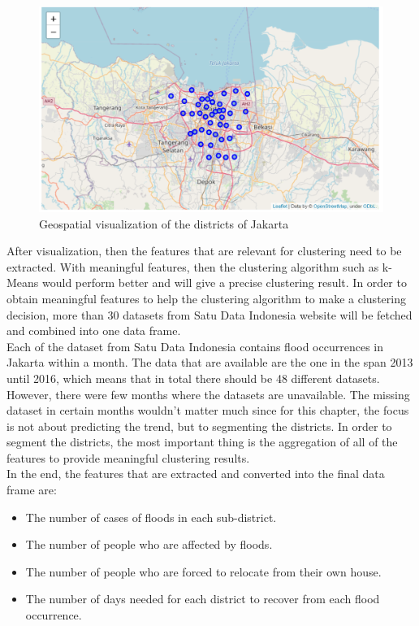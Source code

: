 \begin{figure}
\begin{center}
\graphicspath{ {./Pict/} }
\includegraphics[scale=0.8]{map.png}
\caption{Geospatial visualization of the districts of Jakarta}\label{fig=map.png}
\end{center}
\end{figure}


\noindent
After visualization, then the features that are relevant for clustering need to be extracted. With meaningful features, then the clustering algorithm such as k-Means would perform better and will give a precise clustering result. In order to obtain meaningful features to help the clustering algorithm to make a clustering decision, more than 30 datasets from Satu Data Indonesia website will be fetched and combined into one data frame.\\

\noindent
Each of the dataset from Satu Data Indonesia contains flood occurrences in Jakarta within a month. The data that are available are the one in the span 2013 until 2016, which means that in total there should be 48 different datasets. However, there were few months where the datasets are unavailable. The missing dataset in certain months wouldn't matter much since for this chapter, the focus is not about predicting the trend, but to segmenting the districts. In order to segment the districts, the most important thing is the aggregation of all of the features to provide meaningful clustering results.\\

\noindent
In the end, the features that are extracted and converted into the final data frame are:
\begin{itemize}
\item The number of cases of floods in each sub-district.
\item The number of people who are affected by floods.
\item The number of people who are forced to relocate from their own house.
\item The number of days needed for each district to recover from each flood occurrence.
\end{itemize}

